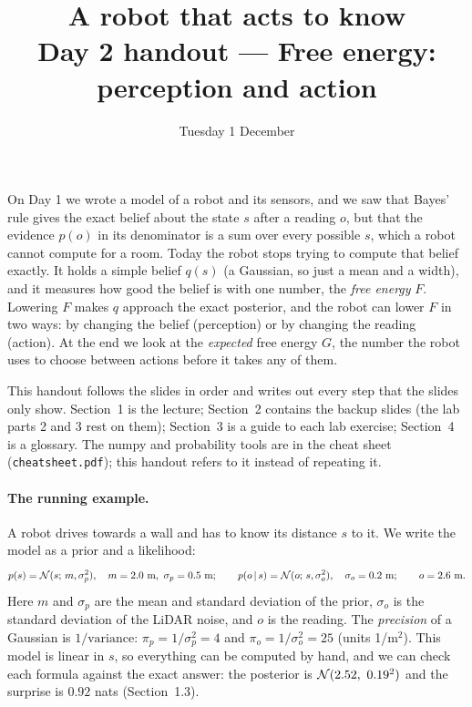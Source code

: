 \documentclass[11pt]{article}
\title{\textbf{A robot that acts to know}\\[0.3em]\large Day 2 handout --- Free energy: perception and action}
\author{}
\date{Tuesday 1 December}
\begin{document}
\maketitle
\vspace{-2em}

\noindent
On Day 1 we wrote a model of a robot and its sensors, and we saw that Bayes' rule gives the exact belief about the state $s$ after a reading $o$, but that the evidence $p(o)$ in its denominator is a sum over every possible $s$, which a robot cannot compute for a room. Today the robot stops trying to compute that belief exactly. It holds a simple belief $q(s)$ (a Gaussian, so just a mean and a width), and it measures how good the belief is with one number, the \emph{free energy} $F$. Lowering $F$ makes $q$ approach the exact posterior, and the robot can lower $F$ in two ways: by changing the belief (perception) or by changing the reading (action). At the end we look at the \emph{expected} free energy $G$, the number the robot uses to choose between actions before it takes any of them.

This handout follows the slides in order and writes out every step that the slides only show. Section~1 is the lecture; Section~2 contains the backup slides (the lab parts 2 and 3 rest on them); Section~3 is a guide to each lab exercise; Section~4 is a glossary. The numpy and probability tools are in the cheat sheet (\texttt{cheatsheet.pdf}); this handout refers to it instead of repeating it.

\paragraph{The running example.}
A robot drives towards a wall and has to know its distance $s$ to it. We write the model as a prior and a likelihood:
\[
p(s) = \mathcal{N}(s;\, m, \sigma_p^2),\quad m = 2.0\text{ m},\ \sigma_p = 0.5\text{ m};\qquad
p(o\,|\, s) = \mathcal{N}(o;\, s, \sigma_o^2),\quad \sigma_o = 0.2\text{ m};\qquad o = 2.6\text{ m}.
\]
Here $m$ and $\sigma_p$ are the mean and standard deviation of the prior, $\sigma_o$ is the standard deviation of the LiDAR noise, and $o$ is the reading. The \emph{precision} of a Gaussian is $1/\text{variance}$: $\pi_p = 1/\sigma_p^2 = 4$ and $\pi_o = 1/\sigma_o^2 = 25$ (units 1/m$^2$). This model is linear in $s$, so everything can be computed by hand, and we can check each formula against the exact answer: the posterior is $\mathcal{N}(2.52,\ 0.19^2)$ and the surprise is $0.92$ nats (Section~1.3).

\end{document}
